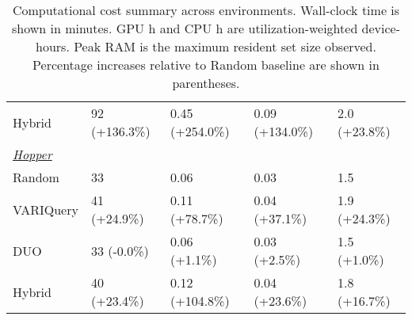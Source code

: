 \begin{table}[h]
\begin{tabular}{lllll}
    \hspace*{2mm}Hybrid     & 92 (+136.3\%)        & 0.45 (+254.0\%) & 0.09 (+134.0\%) & 2.0 (+23.8\%)      \\\n    
    \emph{\underline{Hopper}} & & & & \\
    \hspace*{2mm}Random     & 33                   & 0.06         & 0.03         & 1.5                \\
    \hspace*{2mm}VARIQuery  & 41 (+24.9\%)         & 0.11 (+78.7\%) & 0.04 (+37.1\%) & 1.9 (+24.3\%)      \\
    \hspace*{2mm}DUO        & 33 (-0.0\%)          & 0.06 (+1.1\%) & 0.03 (+2.5\%) & 1.5 (+1.0\%)       \\
    \hspace*{2mm}Hybrid     & 40 (+23.4\%)         & 0.12 (+104.8\%) & 0.04 (+23.6\%) & 1.8 (+16.7\%)      \\
  \end{tabular}
  \caption{Computational cost summary across environments. Wall-clock time is shown in minutes. GPU h and CPU h are utilization-weighted device-hours. Peak RAM is the maximum resident set size observed. Percentage increases relative to Random baseline are shown in parentheses.}
  \label{tab:results:performance-comparisons:computational-overhead}
\end{table}